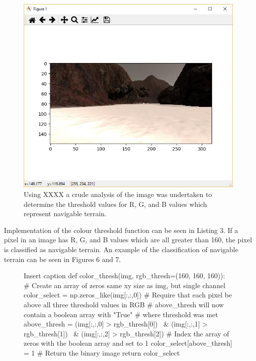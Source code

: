 \documentclass[a4paper]{article}
\begin{document}
\begin{figure}[h]
	\centering
	\includegraphics[scale=0.4]{rock_test}
	\caption{Using XXXX a crude analysis of the image was undertaken to determine the threshold values for R, G, and B values which represent navigable terrain.}
\end{figure}

Implementation of the colour threshold function can be seen in Listing 3. If a pixel in an image has R, G, and B values which are all greater than 160, the pixel is classified as navigable terrain. An example of the classification of navigable terrain can be seen in Figures 6 and 7.

\vspace{0.5cm}

\begin{figure}[H]\scriptsize
\begin{sexylisting}{Insert caption}
def color_thresh(img, rgb_thresh=(160, 160, 160)):
    # Create an array of zeros same xy size as img, but single channel
    color_select = np.zeros_like(img[:,:,0])
    # Require that each pixel be above all three threshold values in RGB
    # above_thresh will now contain a boolean array with "True"
    # where threshold was met
    above_thresh = (img[:,:,0] > rgb_thresh[0]) \
                & (img[:,:,1] > rgb_thresh[1]) \
                & (img[:,:,2] > rgb_thresh[2])
    # Index the array of zeros with the boolean array and set to 1
    color_select[above_thresh] = 1
    # Return the binary image
    return color_select
\end{sexylisting}
\end{figure}
\end{document}
